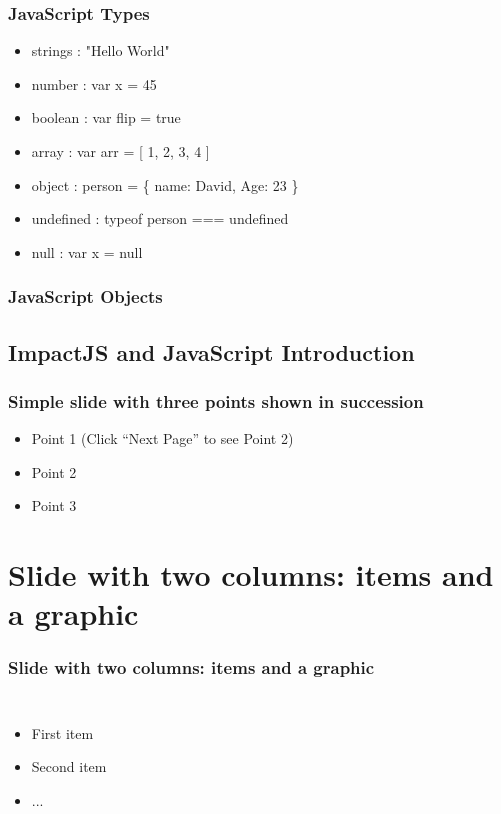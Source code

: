 \documentclass[red]{beamer}
\begin{document}
\begin{frame}
	\frametitle{JavaScript Types}
	 \begin{itemize}
  		\item<1-> strings : "Hello World"
 		\item<2-> number : var x = 45
 		\item<3-> boolean : var flip = true
		\item<4-> array : var arr = [ 1, 2, 3, 4 ]
		\item<5->object : person = \{ name: David, Age: 23 \}
		\item<6->undefined : typeof person === undefined
		\item<7->null : var x = null
 	 \end{itemize}
\end{frame}

\begin{frame}
 	\frametitle{JavaScript Objects}
		\lstI
	
	

\end{frame}
	

\subsection{ImpactJS and JavaScript Introduction}

\begin{frame}
  \frametitle{Simple slide with three points shown in succession}   %

  \begin{itemize}
  \item<1-> Point 1 (Click ``Next Page'' to see Point 2) %
  \item<2-> Point 2  %
  \item<3-> Point 3
  \end{itemize}
\end{frame}



\section{Slide with two columns: items and a graphic}

\begin{frame}
  \frametitle{Slide with two columns: items and a graphic}   %
  \begin{columns}[c]
  \column{2in}  %
  \begin{itemize}
  \item<1-> First item
  \item<2-> Second item
  \item<3-> ...
  \end{itemize}
  \column{2in}
  \end{columns}
\end{frame}
\end{document}
